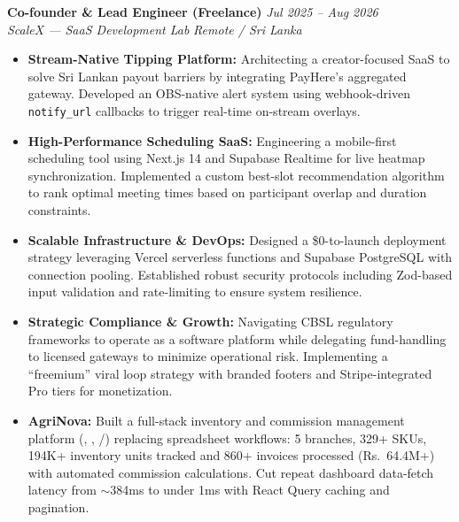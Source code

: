 \noindent
\textbf{Co-founder \& Lead Engineer (Freelance)} \hfill \textit{Jul 2025 -- Aug 2026}\\
\noindent
\textit{ScaleX --- SaaS Development Lab} \hfill \textit{Remote / Sri Lanka}\\[0.05em]
\begin{itemize}[leftmargin=*, itemsep=0.3em, topsep=0.01em]
    \item \textbf{Stream-Native Tipping Platform:} Architecting a creator-focused SaaS to solve Sri Lankan payout barriers by integrating PayHere's aggregated gateway. Developed an OBS-native alert system using webhook-driven \texttt{notify\_url} callbacks to trigger real-time on-stream overlays.
    \item \textbf{High-Performance Scheduling SaaS:} Engineering a mobile-first scheduling tool using Next.js 14 and Supabase Realtime for live heatmap synchronization. Implemented a custom best-slot recommendation algorithm to rank optimal meeting times based on participant overlap and duration constraints.
    \item \textbf{Scalable Infrastructure \& DevOps:} Designed a \$0-to-launch deployment strategy leveraging Vercel serverless functions and Supabase PostgreSQL with connection pooling. Established robust security protocols including Zod-based input validation and rate-limiting to ensure system resilience.
    \item \textbf{Strategic Compliance \& Growth:} Navigating CBSL regulatory frameworks to operate as a software platform while delegating fund-handling to licensed gateways to minimize operational risk. Implementing a ``freemium'' viral loop strategy with branded footers and Stripe-integrated Pro tiers for monetization.
    \item \textbf{AgriNova:} Built a full-stack inventory and commission management platform (, , /\allowbreak{}) replacing spreadsheet workflows: 5 branches, 329+ SKUs, 194K+ inventory units tracked and 860+ invoices processed (Rs.~64.4M+) with automated commission calculations. Cut repeat dashboard data-fetch latency from $\sim$384ms to under 1ms with React Query caching and pagination.
\end{itemize}
